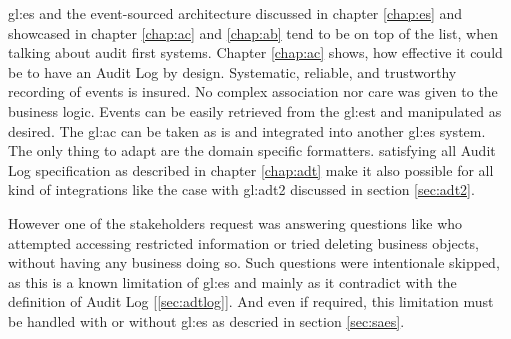 

\gls{gl:es} and the event-sourced architecture discussed in chapter \ref{chap:es} and showcased in chapter \ref{chap:ac} and \ref{chap:ab} tend to be on top of the list, when talking about audit first systems. Chapter \ref{chap:ac} shows, how effective it could be to have an Audit Log by design. Systematic, reliable, and trustworthy recording of events is insured. No complex association nor care was given to the business logic. Events can be easily retrieved from the \gls{gl:est} and manipulated as desired. The \gls{gl:ac} can be taken as is and integrated into another \gls{gl:es} system. The only thing to adapt are the domain specific formatters. satisfying all Audit Log specification as described in chapter \ref{chap:adt} make it also possible for all kind of integrations like the case with \gls{gl:adt2} discussed in section \ref{sec:adt2}. 

However one of the stakeholders request was answering questions like who attempted accessing restricted information or tried deleting business objects, without having any business doing so. Such questions were intentionale skipped, as this is a known limitation of \gls{gl:es} and mainly as it contradict with the definition of Audit Log [\ref{sec:adtlog}]. And even if required, this limitation must be handled with or without \gls{gl:es} as descried in section \ref{sec:saes}.




